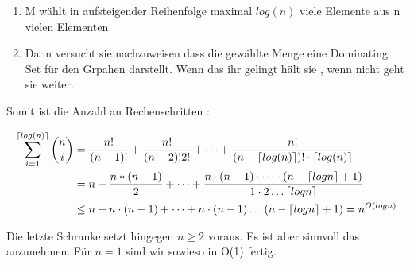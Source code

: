 \documentclass{article}
\def\mathify#1{\ifmmode{#1}\else\mbox{$#1$}\fi} %
\newcommand{\ceil}[1]{\mathify{\left\lceil {#1}\right\rceil}}
\begin{document}
			\begin{enumerate}
				\item M wählt in aufsteigender Reihenfolge maximal $log(n)$ viele Elemente aus n vielen Elementen
				\item Dann versucht sie nachzuweisen dass die gewählte Menge eine Dominating Set für den Grpahen darstellt. Wenn das ihr gelingt hält sie , wenn nicht geht sie weiter.
			\end{enumerate}

			Somit ist die Anzahl an Rechenschritten :

			\begin{align*}
				\sum_{i=1}^{\ceil{log(n)}} \binom{n}{i} &= \frac{n!}{(n-1)!} + \frac{n!}{(n-2)!2!}+\cdots+\frac{n!}{(n-\ceil{log (n)})!\cdot \ceil{log(n)}} \\
				&= n + \frac{n * (n-1)}{2} + \dots + \frac{n \cdot (n-1) \cdot \dots \cdot (n- \ceil{log n}+1)}{1 \cdot 2 \dots \ceil{log n}} \\
				&\leq n + n\cdot (n-1) + \dots + n \cdot (n-1) \dots (n- \ceil{log n} +1) = n^{O(log n)} 
			\end{align*}

			Die letzte Schranke setzt hingegen $n \geq 2$ voraus. Es ist aber sinnvoll das anzunehmen.
			Für $n=1$ sind wir sowieso in O(1) fertig. 
			
\end{document}
